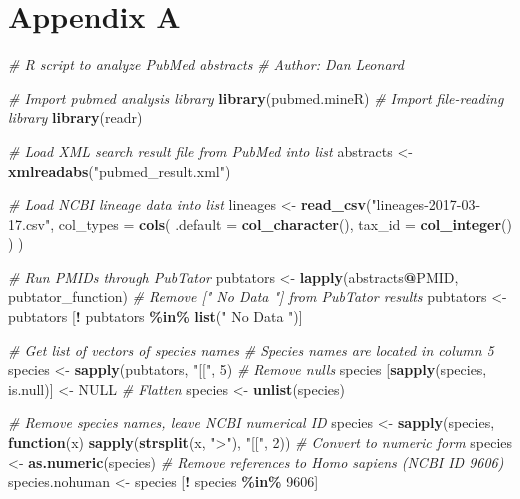 \documentclass{../../../coursework}
\newenvironment{Shaded}{\begin{snugshade}}{\end{snugshade}}
\newcommand{\CommentTok}[1]{\textcolor[rgb]{0.56,0.35,0.01}{\textit{#1}}}
\newcommand{\ControlFlowTok}[1]{\textcolor[rgb]{0.13,0.29,0.53}{\textbf{#1}}}
\newcommand{\DataTypeTok}[1]{\textcolor[rgb]{0.13,0.29,0.53}{#1}}
\newcommand{\DecValTok}[1]{\textcolor[rgb]{0.00,0.00,0.81}{#1}}
\newcommand{\KeywordTok}[1]{\textcolor[rgb]{0.13,0.29,0.53}{\textbf{#1}}}
\newcommand{\NormalTok}[1]{#1}
\newcommand{\OperatorTok}[1]{\textcolor[rgb]{0.81,0.36,0.00}{\textbf{#1}}}
\newcommand{\OtherTok}[1]{\textcolor[rgb]{0.56,0.35,0.01}{#1}}
\newcommand{\StringTok}[1]{\textcolor[rgb]{0.31,0.60,0.02}{#1}}
\begin{document}
\newpage
\section*{Appendix A}

\begin{Shaded}
    \begin{Highlighting}[]
    \CommentTok{\# R script to analyze PubMed abstracts}
    \CommentTok{\# Author: Dan Leonard}
    
    \CommentTok{\# Import pubmed analysis library}
    \KeywordTok{library}\NormalTok{(pubmed.mineR)}
    \CommentTok{\# Import file{-}reading library}
    \KeywordTok{library}\NormalTok{(readr)}
    
    \CommentTok{\# Load XML search result file from PubMed into list}
    \NormalTok{abstracts <{-}}\StringTok{ }\KeywordTok{xmlreadabs}\NormalTok{(}\StringTok{"pubmed\_result.xml"}\NormalTok{)}
    
    \CommentTok{\# Load NCBI lineage data into list}
    \NormalTok{lineages <{-}}\StringTok{ }\KeywordTok{read\_csv}\NormalTok{(}\StringTok{"lineages{-}2017{-}03{-}17.csv"}\NormalTok{,}
        \DataTypeTok{col\_types =} \KeywordTok{cols}\NormalTok{(}
            \DataTypeTok{.default =} \KeywordTok{col\_character}\NormalTok{(),}
            \DataTypeTok{tax\_id =} \KeywordTok{col\_integer}\NormalTok{()}
    \NormalTok{    )}
    \NormalTok{)}
    
    \CommentTok{\# Run PMIDs through PubTator}
    \NormalTok{pubtators <{-}}\StringTok{ }\KeywordTok{lapply}\NormalTok{(abstracts}\OperatorTok{@}\NormalTok{PMID, pubtator\_function)}
    \CommentTok{\# Remove [" No Data "] from PubTator results}
    \NormalTok{pubtators <{-}}\StringTok{ }\NormalTok{pubtators [}\OperatorTok{!}\StringTok{ }\NormalTok{pubtators }\OperatorTok{\%in\%}\StringTok{ }\KeywordTok{list}\NormalTok{(}\StringTok{" No Data "}\NormalTok{)]}
    
    \CommentTok{\# Get list of vectors of species names}
    \CommentTok{\# Species names are located in column 5}
    \NormalTok{species <{-}}\StringTok{ }\KeywordTok{sapply}\NormalTok{(pubtators, }\StringTok{"[["}\NormalTok{, }\DecValTok{5}\NormalTok{)}
    \CommentTok{\# Remove nulls}
    \NormalTok{species [}\KeywordTok{sapply}\NormalTok{(species, is.null)] <{-}}\StringTok{ }\OtherTok{NULL}
    \CommentTok{\# Flatten}
    \NormalTok{species <{-}}\StringTok{ }\KeywordTok{unlist}\NormalTok{(species)}
    
    \CommentTok{\# Remove species names, leave NCBI numerical ID}
    \NormalTok{species <{-}}\StringTok{ }\KeywordTok{sapply}\NormalTok{(species, }\ControlFlowTok{function}\NormalTok{(x) }\KeywordTok{sapply}\NormalTok{(}\KeywordTok{strsplit}\NormalTok{(x, }\StringTok{">"}\NormalTok{), }\StringTok{"[["}\NormalTok{, }\DecValTok{2}\NormalTok{))}
    \CommentTok{\# Convert to numeric form}
    \NormalTok{species <{-}}\StringTok{ }\KeywordTok{as.numeric}\NormalTok{(species)}
    \CommentTok{\# Remove references to Homo sapiens (NCBI ID 9606)}
    \NormalTok{species.nohuman <{-}}\StringTok{ }\NormalTok{species [}\OperatorTok{!}\StringTok{ }\NormalTok{species }\OperatorTok{\%in\%}\StringTok{ }\DecValTok{9606}\NormalTok{]}
    

\end{Highlighting}
\end{Shaded}
\end{document}
